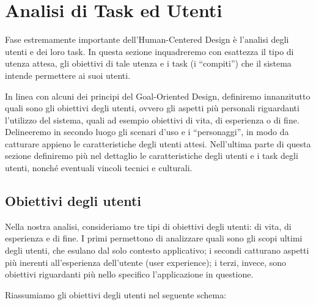 \documentclass[12pt,a4paper,openright, notitlepage]{report}
\begin{document}

\chapter{Analisi di Task ed Utenti}

Fase estremamente importante dell’Human-Centered Design è l’analisi degli utenti e dei loro task. In questa sezione inquadreremo con esattezza il tipo di utenza attesa, gli obiettivi di tale utenza e i task (i “compiti”) che il sistema intende permettere ai suoi utenti.

In linea con alcuni dei principi del Goal-Oriented Design, definiremo innanzitutto quali sono gli obiettivi degli utenti, ovvero gli aspetti più personali riguardanti l’utilizzo del sistema, quali ad esempio obiettivi di vita, di esperienza o di fine. Delineeremo in secondo luogo gli scenari d’uso e i “personaggi”, in modo da catturare appieno le caratteristiche degli utenti attesi. Nell’ultima parte di questa sezione definiremo più nel dettaglio le caratteristiche degli utenti e i task degli utenti, nonché eventuali vincoli tecnici e culturali.

\section{Obiettivi degli utenti}

Nella nostra analisi, consideriamo tre tipi di obiettivi degli utenti: di vita, di esperienza e di fine. I primi permettono di analizzare quali sono gli scopi ultimi degli utenti, che esulano dal solo contesto applicativo; i secondi catturano aspetti più inerenti all’esperienza dell’utente (user experience); i terzi, invece, sono obiettivi riguardanti più nello specifico l’applicazione in questione.

Riassumiamo gli obiettivi degli utenti nel seguente schema:
\end{document}
